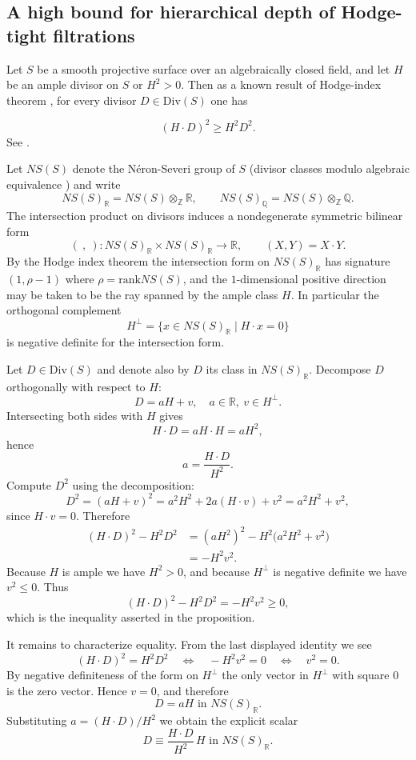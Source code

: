 \documentclass[14pt]{amsart}
\theoremstyle{plain}
\theoremstyle{definition}
\theoremstyle{remark}
\theoremstyle{example}
\def \Z{\mathbb{Z}}
\def \RR{\mathbb{R}}
\def \Q{\mathbb{Q}}
\def \rank{\mathrm{rank}}
\def \Div{\mathrm{Div}}
\begin{document}
\subsection{A high bound for hierarchical depth of Hodge-tight filtrations}


Let $S$ be a smooth projective surface over an algebraically closed field,
and let $H$ be an ample divisor on $S$ or $H^2>0$. Then as a known result of Hodge-index theorem \cite[Theorem V.1.9]{Ha}, for every divisor $D\in\Div(S)$ one has

\begin{equation}\label{eq:hodge}
(H \cdot D)^2 \ge H^2 D^2.
\end{equation}
See \cite[Ex. V.1.9]{Ha}.

Let $NS(S)$ denote the Néron-Severi group of $S$ (divisor classes modulo algebraic equivalence \cite[p. 367]{Ha}) and write
$$NS(S)_{\RR}=NS(S)\otimes_{\Z}\RR,\qquad NS(S)_{\Q}=NS(S)\otimes_{\Z}\Q.$$
The intersection product on divisors induces a nondegenerate symmetric bilinear form
$$(\ ,\ ) : NS(S)_{\RR}\times NS(S)_{\RR}\to\RR,\qquad (X,Y)=X\cdot Y.$$
By the Hodge index theorem the intersection form on $NS(S)_{\RR}$ has signature $(1,\rho-1)$ where $\rho=\rank NS(S)$, and the $1$-dimensional positive direction may be taken to be the ray spanned by the ample class $H$. In particular the orthogonal complement
$$H^\perp=\{x\in NS(S)_{\RR}\mid H\cdot x=0\}$$
is negative definite for the intersection form.

Let $D\in\Div(S)$ and denote also by $D$ its class in $NS(S)_{\RR}$. Decompose $D$ orthogonally with respect to $H$:
$$D=aH+v,\quad a\in\RR,\ v\in H^\perp.$$
Intersecting both sides with $H$ gives
$$H\cdot D=aH\cdot H=aH^2,$$
hence
$$a=\frac{H\cdot D}{H^2}.$$
Compute $D^2$ using the decomposition:
$$D^2 =(aH+v)^2=a^2 H^2+2a(H\cdot v)+v^2=a^2H^2+v^2,$$
since $H\cdot v=0$. Therefore
\begin{align*}
(H\cdot D)^2-H^2 D^2
&=(aH^2)^2-H^2\big(a^2H^2+v^2\big) \\
&=-H^2v^2.
\end{align*}
Because $H$ is ample we have $H^2>0$, and because $H^\perp$ is negative definite we have $v^2\le 0$. Thus
$$
(H\cdot D)^2 - H^2 D^2 = -H^2 v^2 \ge 0,
$$
which is the inequality asserted in the proposition.

It remains to characterize equality. From the last displayed identity we see
$$
(H\cdot D)^2 = H^2 D^2 \quad\Longleftrightarrow\quad -H^2 v^2 = 0
\quad\Longleftrightarrow\quad v^2 = 0.
$$
By negative definiteness of the form on $H^\perp$ the only vector in $H^\perp$ with square $0$ is the zero vector. Hence $v=0$, and therefore
$$
D = aH \text{  in  } NS(S)_{\RR}.
$$
Substituting $a=(H\cdot D)/H^2$ we obtain the explicit scalar
$$
D \equiv \frac{H\cdot D}{H^2}\,H \text{  in  } NS(S)_{\RR}.
$$
\end{document}
